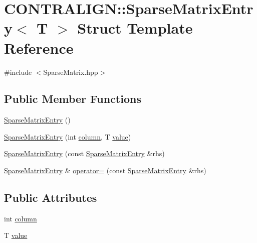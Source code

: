 \hypertarget{struct_c_o_n_t_r_a_l_i_g_n_1_1_sparse_matrix_entry}{\section{C\+O\+N\+T\+R\+A\+L\+I\+G\+N\+:\+:Sparse\+Matrix\+Entry$<$ T $>$ Struct Template Reference}
\label{struct_c_o_n_t_r_a_l_i_g_n_1_1_sparse_matrix_entry}
}


{\ttfamily \#include $<$Sparse\+Matrix.\+hpp$>$}

\subsection*{Public Member Functions}
\begin{DoxyCompactItemize}
\item 
\hyperlink{struct_c_o_n_t_r_a_l_i_g_n_1_1_sparse_matrix_entry_a2a63948f43723867dc9e8146fd2267bb}{Sparse\+Matrix\+Entry} ()
\item 
\hyperlink{struct_c_o_n_t_r_a_l_i_g_n_1_1_sparse_matrix_entry_a57dcf63b91af238e9c85d53b90c805f7}{Sparse\+Matrix\+Entry} (int \hyperlink{struct_c_o_n_t_r_a_l_i_g_n_1_1_sparse_matrix_entry_a9e09b06b482fcef5e44223207aee3bea}{column}, T \hyperlink{struct_c_o_n_t_r_a_l_i_g_n_1_1_sparse_matrix_entry_a61180da626bf3c9f525b5e6ce0af14b8}{value})
\item 
\hyperlink{struct_c_o_n_t_r_a_l_i_g_n_1_1_sparse_matrix_entry_acf78b2e559b5a54a046db6472e51a3a8}{Sparse\+Matrix\+Entry} (const \hyperlink{struct_c_o_n_t_r_a_l_i_g_n_1_1_sparse_matrix_entry}{Sparse\+Matrix\+Entry} \&rhs)
\item 
\hyperlink{struct_c_o_n_t_r_a_l_i_g_n_1_1_sparse_matrix_entry}{Sparse\+Matrix\+Entry} \& \hyperlink{struct_c_o_n_t_r_a_l_i_g_n_1_1_sparse_matrix_entry_a117160b22e1a4740bca03d467f929e62}{operator=} (const \hyperlink{struct_c_o_n_t_r_a_l_i_g_n_1_1_sparse_matrix_entry}{Sparse\+Matrix\+Entry} \&rhs)
\end{DoxyCompactItemize}
\subsection*{Public Attributes}
\begin{DoxyCompactItemize}
\item 
int \hyperlink{struct_c_o_n_t_r_a_l_i_g_n_1_1_sparse_matrix_entry_a9e09b06b482fcef5e44223207aee3bea}{column}
\item 
T \hyperlink{struct_c_o_n_t_r_a_l_i_g_n_1_1_sparse_matrix_entry_a61180da626bf3c9f525b5e6ce0af14b8}{value}
\end{DoxyCompactItemize}


